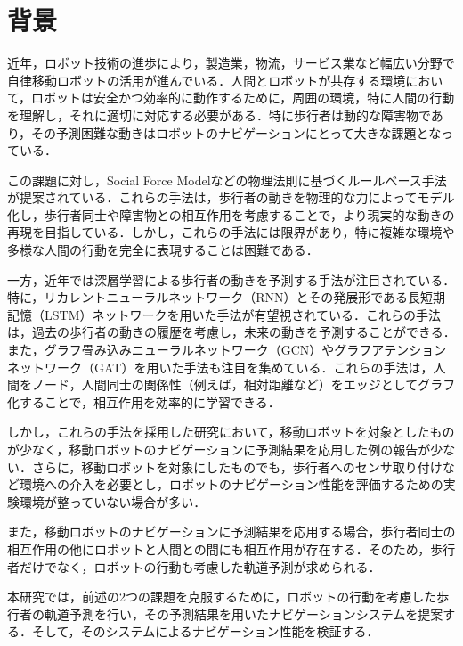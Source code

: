 
\section{背景}
近年，ロボット技術の進歩により，製造業，物流，サービス業など幅広い分野で自律移動ロボットの活用が進んでいる．人間とロボットが共存する環境において，ロボットは安全かつ効率的に動作するために，周囲の環境，特に人間の行動を理解し，それに適切に対応する必要がある．特に歩行者は動的な障害物であり，その予測困難な動きはロボットのナビゲーションにとって大きな課題となっている．

この課題に対し，Social Force Model\cite{s-lstm}などの物理法則に基づくルールベース手法が提案されている．これらの手法は，歩行者の動きを物理的な力によってモデル化し，歩行者同士や障害物との相互作用を考慮することで，より現実的な動きの再現を目指している．しかし，これらの手法には限界があり，特に複雑な環境や多様な人間の行動を完全に表現することは困難である．


一方，近年では深層学習による歩行者の動きを予測する手法が注目されている．特に，リカレントニューラルネットワーク（RNN）\cite{rumelhart1986learning1,rumelhart1986learning2}とその発展形である長短期記憶（LSTM）\cite{hochreiter1997long}ネットワークを用いた手法が有望視されている．これらの手法は，過去の歩行者の動きの履歴を考慮し，未来の動きを予測することができる．また，グラフ畳み込みニューラルネットワーク（GCN）\cite{kipf2016semi-gcn}やグラフアテンションネットワーク（GAT）\cite{velickovic2017graph-gat}を用いた手法も注目を集めている．これらの手法は，人間をノード，人間同士の関係性（例えば，相対距離など）をエッジとしてグラフ化することで，相互作用を効率的に学習できる．

しかし，これらの手法を採用した研究において，移動ロボットを対象としたものが少なく，移動ロボットのナビゲーションに予測結果を応用した例の報告が少ない．さらに，移動ロボットを対象にしたものでも，歩行者へのセンサ取り付けなど環境への介入を必要とし，ロボットのナビゲーション性能を評価するための実験環境が整っていない場合が多い．

また，移動ロボットのナビゲーションに予測結果を応用する場合，歩行者同士の相互作用の他にロボットと人間との間にも相互作用が存在する．そのため，歩行者だけでなく，ロボットの行動も考慮した軌道予測が求められる．

本研究では，前述の2つの課題を克服するために，ロボットの行動を考慮した歩行者の軌道予測を行い，その予測結果を用いたナビゲーションシステムを提案する．そして，そのシステムによるナビゲーション性能を検証する．


\newpage
